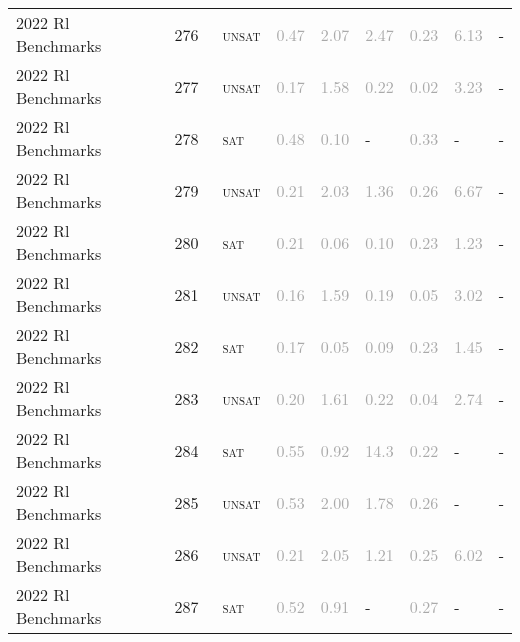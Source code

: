 \begin{center}
{\begin{longtable}{@{}lllllllll@{}}
2022 Rl Benchmarks & 276 & ~\textsc{unsat} & \textcolor{darkgray}{0.47} & \textcolor{darkgray}{2.07} & \textcolor{darkgray}{2.47} & \textcolor{darkgray}{0.23} & \textcolor{darkgray}{6.13} & - \\
2022 Rl Benchmarks & 277 & ~\textsc{unsat} & \textcolor{darkgray}{0.17} & \textcolor{darkgray}{1.58} & \textcolor{darkgray}{0.22} & \textcolor{darkgray}{0.02} & \textcolor{darkgray}{3.23} & - \\
2022 Rl Benchmarks & 278 & ~\textsc{sat} & \textcolor{darkgray}{0.48} & \textcolor{darkgray}{0.10} & - & \textcolor{darkgray}{0.33} & - & - \\
2022 Rl Benchmarks & 279 & ~\textsc{unsat} & \textcolor{darkgray}{0.21} & \textcolor{darkgray}{2.03} & \textcolor{darkgray}{1.36} & \textcolor{darkgray}{0.26} & \textcolor{darkgray}{6.67} & - \\
2022 Rl Benchmarks & 280 & ~\textsc{sat} & \textcolor{darkgray}{0.21} & \textcolor{darkgray}{0.06} & \textcolor{darkgray}{0.10} & \textcolor{darkgray}{0.23} & \textcolor{darkgray}{1.23} & - \\
2022 Rl Benchmarks & 281 & ~\textsc{unsat} & \textcolor{darkgray}{0.16} & \textcolor{darkgray}{1.59} & \textcolor{darkgray}{0.19} & \textcolor{darkgray}{0.05} & \textcolor{darkgray}{3.02} & - \\
2022 Rl Benchmarks & 282 & ~\textsc{sat} & \textcolor{darkgray}{0.17} & \textcolor{darkgray}{0.05} & \textcolor{darkgray}{0.09} & \textcolor{darkgray}{0.23} & \textcolor{darkgray}{1.45} & - \\
2022 Rl Benchmarks & 283 & ~\textsc{unsat} & \textcolor{darkgray}{0.20} & \textcolor{darkgray}{1.61} & \textcolor{darkgray}{0.22} & \textcolor{darkgray}{0.04} & \textcolor{darkgray}{2.74} & - \\
2022 Rl Benchmarks & 284 & ~\textsc{sat} & \textcolor{darkgray}{0.55} & \textcolor{darkgray}{0.92} & \textcolor{darkgray}{14.3} & \textcolor{darkgray}{0.22} & - & - \\
2022 Rl Benchmarks & 285 & ~\textsc{unsat} & \textcolor{darkgray}{0.53} & \textcolor{darkgray}{2.00} & \textcolor{darkgray}{1.78} & \textcolor{darkgray}{0.26} & - & - \\
2022 Rl Benchmarks & 286 & ~\textsc{unsat} & \textcolor{darkgray}{0.21} & \textcolor{darkgray}{2.05} & \textcolor{darkgray}{1.21} & \textcolor{darkgray}{0.25} & \textcolor{darkgray}{6.02} & - \\
2022 Rl Benchmarks & 287 & ~\textsc{sat} & \textcolor{darkgray}{0.52} & \textcolor{darkgray}{0.91} & - & \textcolor{darkgray}{0.27} & - & - \\

\end{longtable}}
\end{center}
